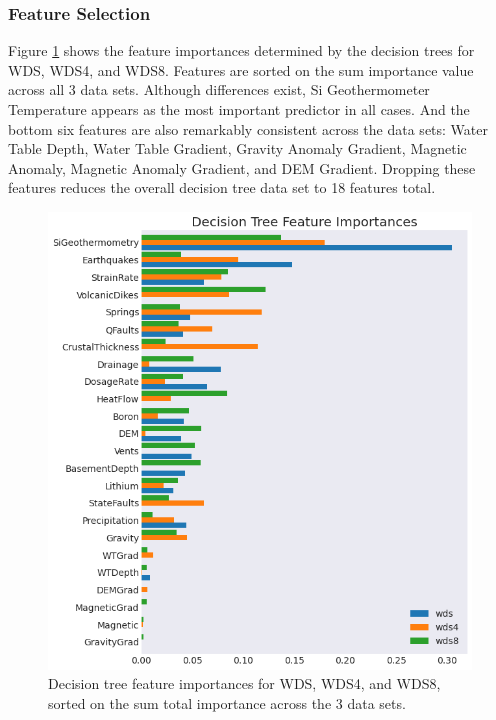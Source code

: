\subsubsection{Feature Selection} \label{ch5:dtree_feat_importance}

Figure \ref{fig:dtree_feat_import} shows the feature importances determined by the decision trees for WDS, WDS4, and WDS8.  Features are sorted on the sum importance value across all 3 data sets. Although differences exist, Si Geothermometer Temperature appears as the most important predictor in all cases. And the bottom six features are also remarkably consistent across the data sets: Water Table Depth, Water Table Gradient, Gravity Anomaly Gradient, Magnetic Anomaly, Magnetic Anomaly Gradient, and DEM Gradient. Dropping these features reduces the overall decision tree data set to 18 features total.

\begin{figure}[!htp]
\centering
\includegraphics[width=\textwidth]{templates/images/Figure-DT_feature_importances_all.png}
\caption[Decision tree feature importances]{Decision tree feature importances for WDS, WDS4, and WDS8, sorted on the sum total importance across the 3 data sets.}
\label{fig:dtree_feat_import}
\end{figure}

